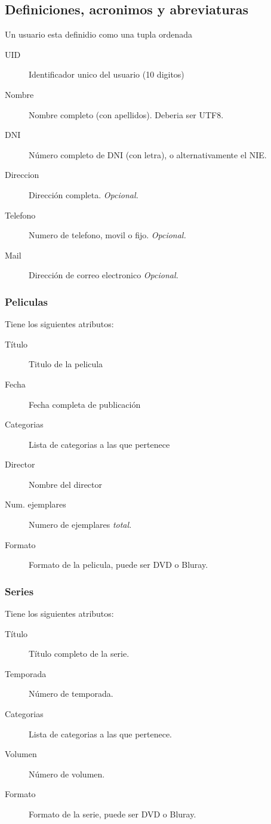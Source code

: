 \documentclass[a4paper, 12pt]{article}
\begin{document}
\subsection{Definiciones, acronimos y abreviaturas}
Un usuario esta definidio como una tupla ordenada
\begin{description}
	\item[UID]      		Identificador unico del usuario (10 digitos)
	\item[Nombre]   		Nombre completo (con apellidos). Deberia ser UTF8.
	\item[DNI]      		Número completo de DNI (con letra), o alternativamente el NIE.
	\item[Direccion]	Dirección completa. \textit{Opcional.}
	\item[Telefono] 		Numero de telefono, movil o fijo. \textit{Opcional.}
	\item[Mail]     		Dirección de correo electronico \textit{Opcional.}
\end{description}

\subsubsection{Peliculas}
Tiene los siguientes atributos:
\begin{description}
	\item[Título] Titulo de la pelicula
	\item[Fecha] Fecha completa de publicación 
	\item[Categorias] Lista de categorias a las que pertenece
	\item[Director] Nombre del director
	\item[Num. ejemplares] Numero de ejemplares \emph{total}.
	\item[Formato] Formato de la pelicula, puede ser DVD o Bluray.
\end{description}

\subsubsection{Series}
Tiene los siguientes atributos:
\begin{description}
	\item[Título] Título completo de la serie.
	\item[Temporada] Número de temporada.
	\item[Categorias] Lista de categorias a las que pertenece.
	\item[Volumen] Número de volumen. 
	\item[Formato] Formato de la serie, puede ser DVD o Bluray.
\end{description}
\end{document}
